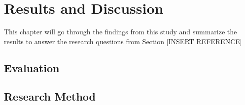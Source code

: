 \chapter{Results and Discussion}
\label{resultsanddiscussion}

This chapter will go through the findings from this study and summarize the results to answer the research questions from Section [INSERT REFERENCE]


\section{Evaluation}


\section{Research Method}


